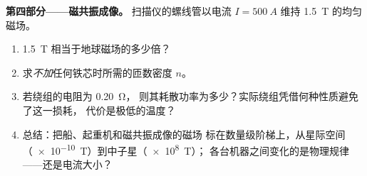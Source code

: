 \begin{problem}
\medskip
\noindent\textbf{第四部分——磁共振成像。}
扫描仪的螺线管以电流
$I = \qty{500}{A}$ 维持 \qty{1.5}{T} 的均匀磁场。
\begin{enumerate}[resume]
  \item \qty{1.5}{T} 相当于地球磁场的多少倍？
  \item 求\emph{不加}任何铁芯时所需的匝数密度 $n$。
  \item 若绕组的电阻为 \qty{0.20}{\ohm}，
        则其耗散功率为多少？实际绕组凭借何种性质避免了这一损耗，
        代价是极低的温度？
  \item 总结：把船、起重机和磁共振成像的磁场
        标在数量级阶梯上，从星际空间
        （\qty{e-10}{T}）到中子星（\qty{e8}{T}）；
        各台机器之间变化的是物理规律——还是电流大小？
\end{enumerate}
\end{problem}
